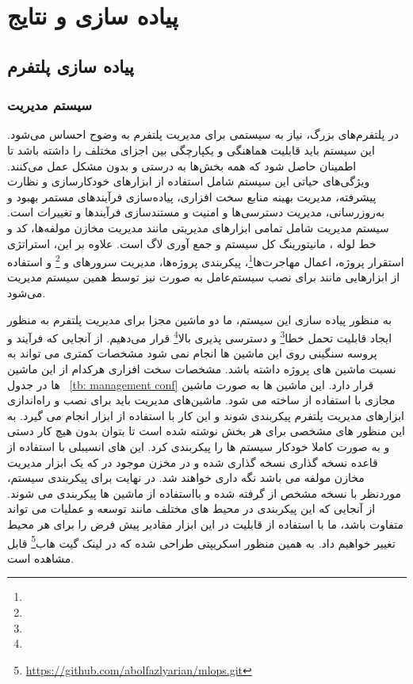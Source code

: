 \chapter{پیاده سازی و نتایج}

\section{پیاده سازی پلتفرم}
\subsection{سیستم مدیریت}

در پلتفرم‌های بزرگ، نیاز به سیستمی برای مدیریت پلتفرم به وضوح احساس می‌شود. این سیستم باید قابلیت هماهنگی و یکپارچگی بین اجزای مختلف را داشته باشد تا اطمینان حاصل شود که همه بخش‌ها به درستی و بدون مشکل عمل می‌کنند. ویژگی‌های حیاتی این سیستم شامل استفاده از ابزارهای خودکارسازی و نظارت پیشرفته، مدیریت بهینه منابع سخت افزاری، پیاده‌سازی فرآیندهای مستمر بهبود و به‌روزرسانی، مدیریت دسترسی‌ها و امنیت و مستندسازی فرآیندها و تغییرات است. سیستم مدیریت شامل تمامی ابزارهای مدیریتی مانند مدیریت مخازن مولفه‌ها، کد و خط لوله ، مانیتورینگ کل سیستم و جمع آوری لاگ است. علاوه بر این، استراتژی استقرار پروژه، اعمال مهاجرت‌ها\footnote{}، پیکربندی پروژه‌ها، مدیریت سرورهای  و \footnote{} و استفاده از ابزارهایی مانند  برای نصب سیستم‌عامل به صورت  نیز توسط همین سیستم مدیریت می‌شود.

به منظور پیاده سازی این سیستم، ما دو ماشین مجزا برای مدیریت پلتفرم به منظور ایجاد قابلیت تحمل خطا\footnote{} و دسترسی پذیری بالا\footnote{}  قرار می‌دهیم. از آنجایی که فرآیند و پروسه سنگینی روی این ماشین ها انجام نمی شود مشخصات کمتری می تواند به نسبت ماشین های پروژه داشته باشد. مشخصات سخت افزاری هرکدام از این ماشین ها در جدول
~\ref{tb: management conf}
قرار دارد.  این ماشین ها به صورت ماشین مجازی با استفاده از  ساخته می شود. ماشین‌های مدیریت باید برای نصب و راه‌اندازی ابزارهای مدیریت پلتفرم پیکربندی شوند و این کار با استفاده از ابزار  انجام می گیرد. به این منظور  های مشخصی برای هر بخش نوشته شده است تا بتوان بدون هیچ کار دستی و به صورت کاملا خودکار سیستم ها را پیکربندی کرد. این  های انسیبلی با استفاده از قاعده نسخه گذاری  نسخه گذاری شده و در مخزن  موجود در  که یک ابزار مدیریت مخازن مولفه می باشد نگه داری خواهند شد. در نهایت برای پیکربندی سیستم،  موردنظر با نسخه مشخص از  گرفته شده و بااستفاده از  ماشین ها پیکربندی می شوند. از آنجایی که این پیکربندی در محیط های مختلف مانند توسعه و عملیات می تواند متفاوت باشد، ما با استفاده از قابلیت  در این ابزار مقادیر پیش فرض را برای هر محیط تغییر خواهیم داد. به همین منظور اسکریپتی طراحی شده که در لینک 
گیت هاب\footnote{\url{https://github.com/abolfazlyarian/mlops.git}} قابل مشاهده است.

